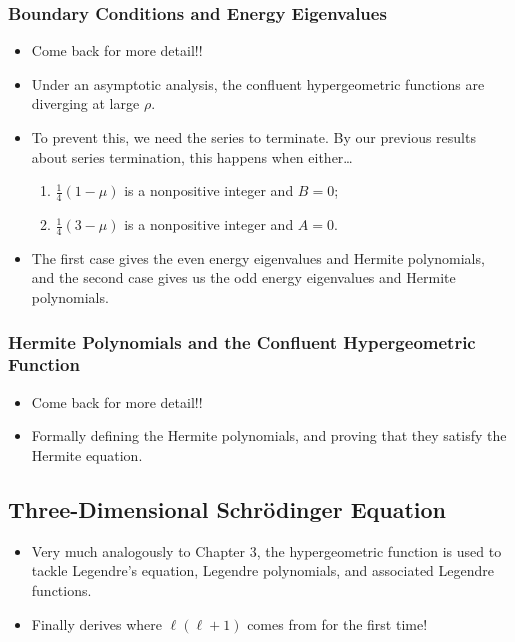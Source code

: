 \documentclass[../finalProject.tex]{subfiles}
\begin{document}
\subsubsection*{Boundary Conditions and Energy Eigenvalues}
\begin{itemize}
    \item Come back for more detail!!
    \item Under an asymptotic analysis, the confluent hypergeometric functions are diverging at large $\rho$.
    \item To prevent this, we need the series to terminate. By our previous results about series termination, this happens when either\dots
    \begin{enumerate}
        \item $\frac{1}{4}(1-\mu)$ is a nonpositive integer and $B=0$;
        \item $\frac{1}{4}(3-\mu)$ is a nonpositive integer and $A=0$.
    \end{enumerate}
    \item The first case gives the even energy eigenvalues and Hermite polynomials, and the second case gives us the odd energy eigenvalues and Hermite polynomials.
\end{itemize}

\subsubsection*{Hermite Polynomials and the Confluent Hypergeometric Function}
\begin{itemize}
    \item Come back for more detail!!
    \item Formally defining the Hermite polynomials, and proving that they satisfy the Hermite equation.
\end{itemize}


\subsection*{Three-Dimensional Schr\"{o}dinger Equation}
\begin{itemize}
    \item Very much analogously to Chapter 3, the hypergeometric function is used to tackle Legendre's equation, Legendre polynomials, and associated Legendre functions.
    \item Finally derives where $\ell(\ell+1)$ comes from for the first time!
\end{itemize}
\end{document}
